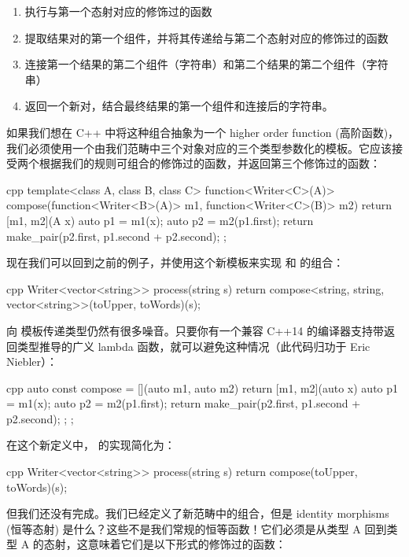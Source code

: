 \begin{enumerate}
  \tightlist
  \item
        执行与第一个态射对应的修饰过的函数
  \item
        提取结果对的第一个组件，并将其传递给与第二个态射对应的修饰过的函数
  \item
        连接第一个结果的第二个组件（字符串）和第二个结果的第二个组件（字符串）
  \item
        返回一个新对，结合最终结果的第一个组件和连接后的字符串。
\end{enumerate}

如果我们想在 C++ 中将这种组合抽象为一个 higher order function (高阶函数)，我们必须使用一个由我们范畴中三个对象对应的三个类型参数化的模板。它应该接受两个根据我们的规则可组合的修饰过的函数，并返回第三个修饰过的函数：

\begin{snip}{cpp}
template<class A, class B, class C>
function<Writer<C>(A)> compose(function<Writer<B>(A)> m1,
                               function<Writer<C>(B)> m2)
{
    return [m1, m2](A x) {
        auto p1 = m1(x);
        auto p2 = m2(p1.first);
        return make_pair(p2.first, p1.second + p2.second);
    };
}
\end{snip}
现在我们可以回到之前的例子，并使用这个新模板来实现  和  的组合：

\begin{snip}{cpp}
Writer<vector<string>> process(string s) {
    return compose<string, string, vector<string>>(toUpper, toWords)(s);
}
\end{snip}
向 模板传递类型仍然有很多噪音。只要你有一个兼容 C++14 的编译器支持带返回类型推导的广义 lambda 函数，就可以避免这种情况（此代码归功于 Eric Niebler）：

\begin{snip}{cpp}
auto const compose = [](auto m1, auto m2) {
    return [m1, m2](auto x) {
        auto p1 = m1(x);
        auto p2 = m2(p1.first);
        return make_pair(p2.first, p1.second + p2.second);
    };
};
\end{snip}
在这个新定义中， 的实现简化为：

\begin{snip}{cpp}
Writer<vector<string>> process(string s) {
    return compose(toUpper, toWords)(s);
}
\end{snip}
但我们还没有完成。我们已经定义了新范畴中的组合，但是 identity morphisms (恒等态射) 是什么？这些不是我们常规的恒等函数！它们必须是从类型 A 回到类型 A 的态射，这意味着它们是以下形式的修饰过的函数：

